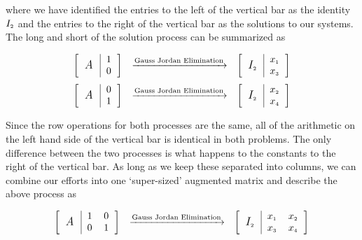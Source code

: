 \documentclass{ximera}
\begin{document}
where we have identified the entries to the left of the vertical bar as the identity $I_{\mbox{\tiny$2$}}$ and the entries to the right of the vertical bar as the solutions to our systems.  The long and short of the solution process can be summarized as

\[ \begin{array}{ccc}

\left[ \begin{tabular}{c|r} \multirow{2}{10pt}{\large \textit{A}} & 1 \\ & 0 \end{tabular} \right]
&
\xrightarrow{\text{Gauss Jordan Elimination}}
&
\left[ \begin{tabular}{c|r} \multirow{2}{10pt}{\large $I_{\mbox{\tiny$2$}}$} & $x_{\mbox{\tiny$1$}}$ \\ &  $x_{\mbox{\tiny$3$}}$ \end{tabular} \right]  \\ [13pt]

\left[ \begin{tabular}{c|r} \multirow{2}{10pt}{\large \textit{A}} & 0 \\ & 1 \end{tabular} \right]
&
\xrightarrow{\text{Gauss Jordan Elimination}}
&
\left[ \begin{tabular}{c|r} \multirow{2}{10pt}{\large $I_{\mbox{\tiny$2$}}$} & $x_{\mbox{\tiny$2$}}$ \\ & $x_{\mbox{\tiny$4$}}$ \end{tabular} \right]

\end{array}\]

Since the row operations for both processes are the same, all of the arithmetic on the left hand side of the vertical bar is identical in both problems.  The only difference between the two processes is what happens to the constants to the right of the vertical bar.  As long as we keep these separated into columns, we can combine our efforts into one `super-sized' augmented matrix and describe the above process as

\[ \begin{array}{ccc}

\left[ \begin{tabular}{c|rr} \multirow{2}{10pt}{\large \textit{A}} & 1 & 0 \\ & 0 & 1 \end{tabular} \right]
&
\xrightarrow{\text{Gauss Jordan Elimination}}
&
\left[ \begin{tabular}{c|rr} \multirow{2}{10pt}{\large $I_{\mbox{\tiny$2$}}$} & $x_{\mbox{\tiny$1$}}$ & $x_{\mbox{\tiny$2$}}$ \\ &  $x_{\mbox{\tiny$3$}}$ & $x_{\mbox{\tiny$4$}}$ \end{tabular} \right]

\end{array}\]
\end{document}
